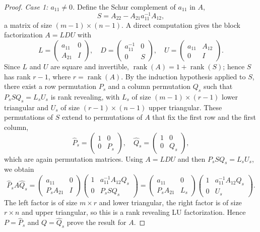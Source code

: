 \documentclass[10pt,twoside]{siamart1116}
\DeclareMathOperator{\rk}{rank}
\newcommand{\by}{\times}
\numberwithin{theorem}{section}
\begin{document}
\begin{proof}
  \emph{Case 1: $a_{11} \neq 0$.} Define the Schur complement of $a_{11}$ in $A$,
  \[
    S = A_{22} - A_{21} a_{11}^{-1} A_{12},
  \]
  a matrix of size $(m-1) \by (n-1)$. A direct computation gives the block factorization $A = LDU$ with
  \[
    L =
    \begin{pmatrix}
      a_{11} & 0 \\
      A_{21} & I
    \end{pmatrix}, \quad
    D =
    \begin{pmatrix}
      a_{11}^{-1} & 0 \\
      0           & S
    \end{pmatrix}, \quad
    U =
    \begin{pmatrix}
      a_{11} & A_{12} \\
      0      & I
    \end{pmatrix}.
  \]
  Since $L$ and $U$ are square and invertible, $\rk(A) = 1 + \rk(S)$; hence $S$ has rank $r-1$, where $r = \rk(A)$. By the induction hypothesis applied to $S$, there exist a row permutation $P_s$ and a column permutation $Q_s$ such that $P_s S Q_s = L_s U_s$ is rank revealing, with $L_s$ of size $(m-1) \by (r-1)$ lower triangular and $U_s$ of size $(r-1) \by (n-1)$ upper triangular. These permutations of $S$ extend to permutations of $A$ that fix the first row and the first column,
  \[
    \widehat{P}_s =
    \begin{pmatrix}
      1 & 0   \\
      0 & P_s
    \end{pmatrix}, \quad
    \widehat{Q}_s =
    \begin{pmatrix}
      1 & 0   \\
      0 & Q_s
    \end{pmatrix},
  \]
  which are again permutation matrices. Using $A = LDU$ and then $P_s S Q_s = L_s U_s$, we obtain
  \[
    \widehat{P}_s A \widehat{Q}_s
    =
    \begin{pmatrix}
      a_{11}     & 0 \\
      P_s A_{21} & I
    \end{pmatrix}
    \begin{pmatrix}
      1 & a_{11}^{-1} A_{12} Q_s \\
      0 & P_s S Q_s
    \end{pmatrix}
    =
    \begin{pmatrix}
      a_{11}     & 0   \\
      P_s A_{21} & L_s
    \end{pmatrix}
    \begin{pmatrix}
      1 & a_{11}^{-1} A_{12} Q_s \\
      0 & U_s
    \end{pmatrix}.
  \]
  The left factor is of size $m \by r$ and lower triangular, the right factor is of size $r \by n$ and upper triangular, so this is a rank revealing LU factorization. Hence $P = \widehat{P}_s$ and $Q = \widehat{Q}_s$ prove the result for $A$.


\end{proof}
\end{document}
